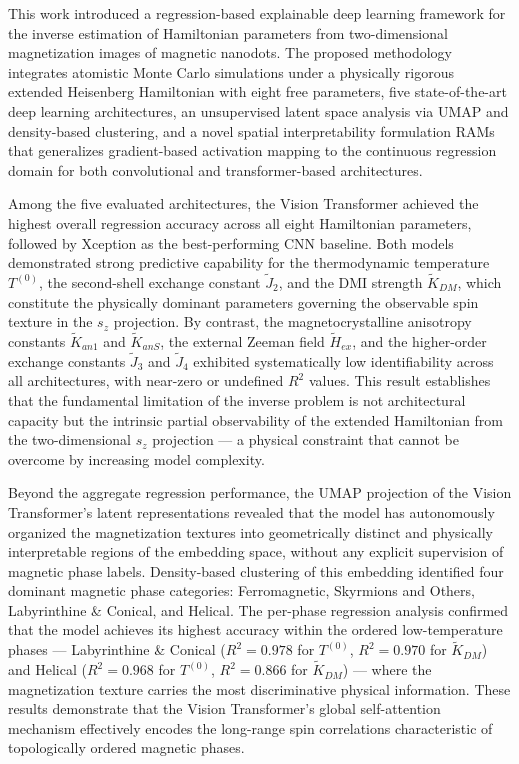 \documentclass[a4paper,fleqn]{cas-sc}
\begin{document}
This work introduced a regression-based explainable deep learning
framework for the inverse estimation of Hamiltonian parameters from
two-dimensional magnetization images of magnetic nanodots. The
proposed methodology integrates atomistic Monte Carlo simulations
under a physically rigorous extended Heisenberg Hamiltonian with eight
free parameters, five state-of-the-art deep learning architectures, an
unsupervised latent space analysis via UMAP and density-based
clustering, and a novel spatial interpretability formulation RAMs that generalizes gradient-based
activation mapping to the continuous regression domain for both
convolutional and transformer-based architectures.
 
Among the five evaluated architectures, the Vision Transformer
achieved the highest overall regression accuracy across all eight
Hamiltonian parameters, followed by Xception as the best-performing
CNN baseline. Both models demonstrated strong predictive capability
for the thermodynamic temperature $T^{(0)}$, the second-shell exchange
constant $\tilde{J}_2$, and the DMI
strength $\tilde{K}_{DM}$, which constitute the physically dominant
parameters governing the observable spin texture in the $s_z$
projection. By contrast, the magnetocrystalline anisotropy constants
$\tilde{K}_{an1}$ and $\tilde{K}_{anS}$, the external Zeeman field
$\tilde{H}_{ex}$, and the higher-order exchange constants
$\tilde{J}_3$ and $\tilde{J}_4$ exhibited systematically low
identifiability across all architectures, with near-zero or undefined
$R^2$ values. This result establishes that the fundamental limitation
of the inverse problem is not architectural capacity but the intrinsic
partial observability of the extended Hamiltonian from the
two-dimensional $s_z$ projection --- a physical constraint that cannot
be overcome by increasing model complexity.
 
Beyond the aggregate regression performance, the UMAP projection of
the Vision Transformer's latent representations revealed that the
model has autonomously organized the magnetization textures into
geometrically distinct and physically interpretable regions of the
embedding space, without any explicit supervision of magnetic phase
labels. Density-based clustering of this embedding identified four
dominant magnetic phase categories: Ferromagnetic, Skyrmions and
Others, Labyrinthine \& Conical, and Helical. The per-phase regression
analysis confirmed that the model achieves its highest accuracy within
the ordered low-temperature phases --- Labyrinthine \& Conical
($R^2 = 0.978$ for $T^{(0)}$, $R^2 = 0.970$ for $\tilde{K}_{DM}$) and
Helical ($R^2 = 0.968$ for $T^{(0)}$, $R^2 = 0.866$ for
$\tilde{K}_{DM}$) --- where the magnetization texture carries the most
discriminative physical information. These results demonstrate that
the Vision Transformer's global self-attention mechanism effectively
encodes the long-range spin correlations characteristic of
topologically ordered magnetic phases.
 
\end{document}
